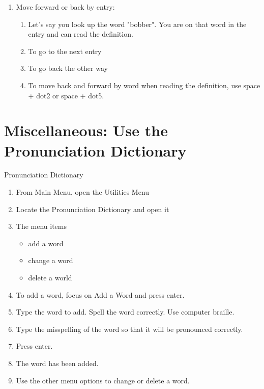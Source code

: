 \documentclass[10pt,letterpaper,twoside]{report}
\begin{document}
{{{{\begin{enumerate}
\begin{enumerate}
		      \item Open your document.
		      \item Place the cursor on the word you want to look up.
		      \item Press space + o.
		      \item Press letter l for "look up".
		      \item Press d for dictionary.
		      \item Notice the word your cursor was on in the document is already displayed after the "word to look up" cue.
		      \item Press enter to look up the word.
		      \item Use dictionary commands to read.
	      \end{enumerate}
	\item Move forward or back by entry:
	      \begin{enumerate}
		      \item Let's say you look up the word "bobber". You are on that word in the entry and can read the definition.
		      \item To go to the next entry 
		      \item To go back the other way 
		      \item To move back and forward by word when reading the definition, use space + dot2 or space + dot5.
	      \end{enumerate}
\end{enumerate}

\clearpage
\section{Miscellaneous: Use the Pronunciation Dictionary}
Pronunciation Dictionary
\begin{enumerate}
	\item From Main Menu, open the Utilities Menu 
	\item Locate the Pronunciation Dictionary and open it
	\item The menu items
	      \begin{itemize}
		      \item add a word
		      \item change a word
		      \item delete a world
	      \end{itemize}
	\item To add a word, focus on Add a Word and press enter.
	\item Type the word to add. Spell the word correctly. Use computer braille.
	\item Type the misspelling of the word so that it will be pronounced correctly.
	\item Press enter.
	\item The word has been added.
	\item Use the other menu options to change or delete a word.
\end{enumerate}

}}}}
\end{document}
